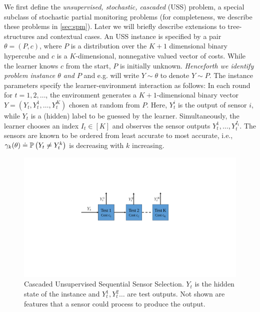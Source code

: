 We first define the {\it unsupervised, stochastic, 
cascaded \ses} (USS) problem, a special subclass of stochastic partial monitoring problems 
(for completeness, we describe these problems in \cref{sec:spm}).
Later we will briefly describe extensions to tree-structures and contextual cases. 
An USS instance is specified by a pair $\theta = (P,c)$, where $P$ is
a distribution over the $K+1$ dimensional binary hypercube
and $c$ is a $K$-dimensional, nonnegative valued vector of costs.
While the learner knows $c$ from the start, $P$ is initially unknown. 
\emph{Henceforth we identify problem instance $\theta$ and $P$ } and e.g. will write $Y\sim \theta$ to denote
$Y \sim P$.
The instance parameters specify the learner-environment interaction as follows:
In each round for $t=1,2,\dots$, 
the environment generates a $K+1$-dimensional binary vector
$Y = (Y_t,Y_t^1,\dots,Y_t^K)$ chosen at random from $P$.
Here, $Y_t^i$ is the output of sensor $i$, while $Y_t$ is a (hidden) label to be guessed by the learner.
Simultaneously, the learner chooses an index $I_t\in [K]$ and observes the sensor outputs $Y_t^1,\dots,Y_t^{I_t}$.
The sensors are known to be ordered from least accurate to most accurate, 
i.e., $\gamma_k(\theta) \doteq \mathbb{P}\left(Y_t\ne Y_t^k\right)$ is decreasing with $k$ increasing.
\begin{figure}[!h]
	\centering
	\includegraphics[scale=.4]{../Figures/Cascade.pdf}
	\caption{\footnotesize Cascaded Unsupervised Sequential Sensor Selection. $Y_t$ is the hidden state of the instance and $Y_t^1, Y_t^2 \ldots$ are test outputs. Not shown are features that a sensor could process to produce the output.}
	\label{fig:SensorCascade}
	\vspace{-.2cm}
\end{figure} 
